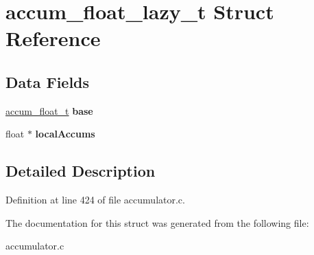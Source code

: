 \hypertarget{structaccum__float__lazy__t}{\section{accum\-\_\-float\-\_\-lazy\-\_\-t Struct Reference}
\label{structaccum__float__lazy__t}
}
\subsection*{Data Fields}
\begin{DoxyCompactItemize}
\item 
\hypertarget{structaccum__float__lazy__t_a3392088102a1afba57a9b16eb26a3f19}{\hyperlink{structaccum__float__t}{accum\-\_\-float\-\_\-t} {\bfseries base}}\label{structaccum__float__lazy__t_a3392088102a1afba57a9b16eb26a3f19}

\item 
\hypertarget{structaccum__float__lazy__t_adb4c322c40bf7bde59d89e75cfbfb180}{float $\ast$ {\bfseries local\-Accums}}\label{structaccum__float__lazy__t_adb4c322c40bf7bde59d89e75cfbfb180}

\end{DoxyCompactItemize}


\subsection{Detailed Description}


Definition at line 424 of file accumulator.\-c.



The documentation for this struct was generated from the following file\-:\begin{DoxyCompactItemize}
\item 
accumulator.\-c\end{DoxyCompactItemize}
